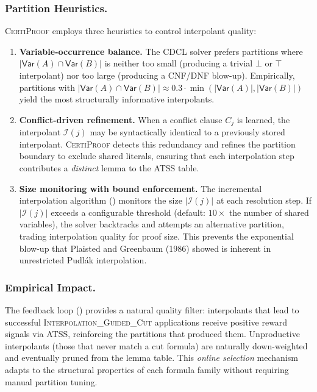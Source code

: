 \documentclass[acmtocl,review,anonymous]{acmart}
\newcommand{\Var}{\mathsf{Var}}
\newcommand{\CP}{\textsc{CertiProof}}
\begin{document}
\subsubsection*{Partition Heuristics.}
\CP{} employs three heuristics to control interpolant quality:
\begin{enumerate}
  \item \textbf{Variable-occurrence balance.}
    The CDCL solver prefers partitions where
    $|\Var(A) \cap \Var(B)|$ is neither too small (producing a
    trivial $\bot$ or $\top$ interpolant) nor too large (producing a
    CNF/DNF blow-up).  Empirically, partitions with
    $|\Var(A) \cap \Var(B)| \approx 0.3 \cdot \min(|\Var(A)|,
    |\Var(B)|)$ yield the most structurally informative interpolants.

  \item \textbf{Conflict-driven refinement.}
    When a conflict clause $C_j$ is learned, the interpolant
    $\mathcal{I}(j)$ may be syntactically identical to a previously
    stored interpolant.  \CP{} detects this redundancy and refines
    the partition boundary to exclude shared literals, ensuring
    that each interpolation step contributes a \emph{distinct} lemma
    to the ATSS table.

  \item \textbf{Size monitoring with bound enforcement.}
    The incremental interpolation algorithm ()
    monitors the size $|\mathcal{I}(j)|$ at each resolution step.
    If $|\mathcal{I}(j)|$ exceeds a configurable threshold (default:
    $10 \times$ the number of shared variables), the solver backtracks
    and attempts an alternative partition, trading interpolation
    quality for proof size.  This prevents the exponential blow-up
    that Plaisted and Greenbaum (1986) showed is inherent in
    unrestricted Pudl\'{a}k interpolation.
\end{enumerate}

\subsubsection*{Empirical Impact.}
The feedback loop () provides a natural
quality filter: interpolants that lead to successful
\textsc{Interpolation\_Guided\_Cut} applications receive positive
reward signals via ATSS, reinforcing the partitions that produced
them.  Unproductive interpolants (those that never match a cut
formula) are naturally down-weighted and eventually pruned from the
lemma table.  This \emph{online selection} mechanism adapts to the
structural properties of each formula family without requiring manual
partition tuning.
\end{document}
